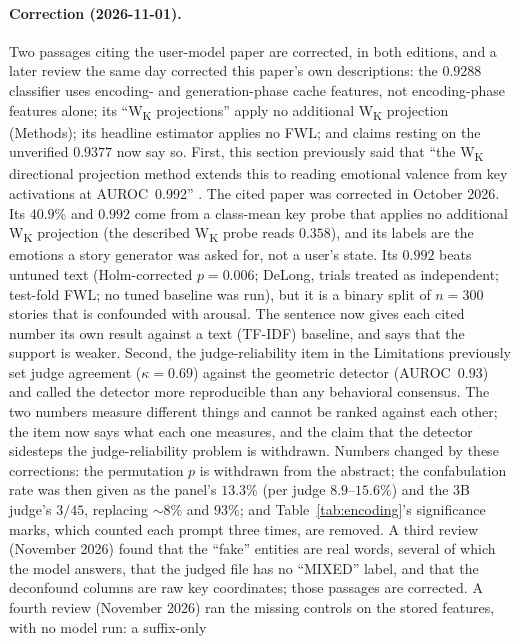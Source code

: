 \documentclass[11pt,a4paper]{article}
\begin{document}
\paragraph{Correction (2026-11-01).}
Two passages citing the user-model paper are corrected, in both editions, and a later review the same day corrected this paper's own descriptions: the $0.9288$ classifier uses encoding- and generation-phase cache features, not encoding-phase features alone; its ``W\textsubscript{K} projections'' apply no additional W\textsubscript{K} projection (Methods); its headline estimator applies no FWL; and claims resting on the unverified $0.9377$ now say so. First, this section
previously said that ``the W\textsubscript{K} directional projection
method extends this to reading emotional valence from key activations at
AUROC~0.992'' \citep{lyra2026usermodel}. The cited paper was
corrected in October 2026. Its $40.9\%$ and $0.992$ come from a
class-mean key probe that applies no additional W\textsubscript{K} projection (the described
W\textsubscript{K} probe reads $0.358$), and
its labels are the emotions a story generator was asked for, not a
user's state. Its $0.992$ beats untuned text (Holm-corrected $p = 0.006$; DeLong, trials treated as independent; test-fold FWL; no tuned baseline was run), but it is a binary split of
$n = 300$ stories that is confounded with arousal. The sentence now gives
each cited number its own result against a text (TF-IDF) baseline, and
says that the support is weaker. Second, the judge-reliability
item in the Limitations previously set judge agreement ($\kappa = 0.69$)
against the geometric detector (AUROC~$0.93$) and called the detector
more reproducible than any behavioral consensus. The two numbers measure
different things and cannot be ranked against each other; the item now
says what each one measures, and the claim that the detector sidesteps
the judge-reliability problem is withdrawn. Numbers changed by these corrections: the
permutation $p$ is withdrawn from the abstract; the confabulation rate was
then given as the panel's $13.3\%$ (per judge $8.9$--$15.6\%$) and the 3B judge's
$3/45$, replacing ${\sim}8\%$ and $93\%$; and Table~\ref{tab:encoding}'s
significance marks, which counted each prompt three times, are removed. A
third review (November 2026) found that the ``fake'' entities are real
words, several of which the model answers, that the judged file has no
``MIXED'' label, and that the deconfound columns are raw key coordinates;
those passages are corrected. A fourth review (November 2026) ran the
missing controls on the stored features, with no model run: a suffix-only
\end{document}
